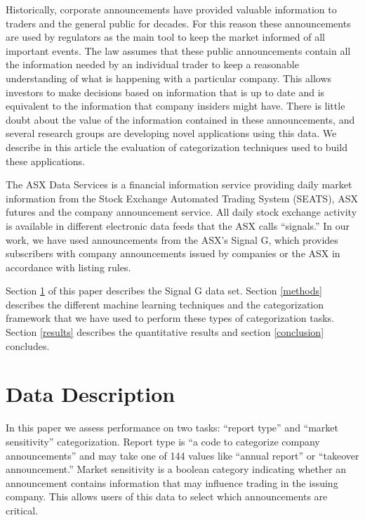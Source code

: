 \documentclass[twocolumn]{article}
\begin{document}
Historically, corporate announcements have provided valuable
information to traders and the general public for decades. For this
reason these announcements are used by regulators as the main tool to
keep the market informed of all important events. The law assumes that
these public announcements contain all the information needed by an
individual trader to keep a reasonable understanding of what is
happening with a particular company. This allows investors to make
decisions based on information that is up to date and is equivalent to
the information that company insiders might have. There is little
doubt about the value of the information contained in these
announcements, and several research groups are developing
novel applications using this data.  We describe in this article
the evaluation of categorization techniques used to build these
applications.

The ASX Data Services is a financial information service providing
daily market information from the Stock Exchange Automated Trading
System (SEATS), ASX futures and the company announcement service.  All
daily stock exchange activity is available in different electronic
data feeds that the ASX calls ``signals.''  In our work, we have used
announcements from the ASX's Signal G, which provides subscribers with
company announcements issued by companies or the ASX in accordance
with listing rules.

Section \ref{data} of this paper
describes the Signal G data set.  Section \ref{methods} describes the
different machine learning techniques and the categorization framework
that we have used to perform these types of categorization
tasks. Section \ref{results} describes the quantitative results and
section \ref{conclusion} concludes.

\section{Data Description}
\label{data}

In this paper we assess performance on two tasks: ``report type'' and
``market sensitivity'' categorization. Report type is ``a code to
categorize company announcements'' \cite{asx:02} and may take one of 144 values
like ``annual report'' or ``takeover announcement.'' Market
sensitivity is a boolean category indicating whether an announcement
contains information that may influence trading in the issuing
company. This allows users of this data to select which announcements
are critical.
\end{document}
